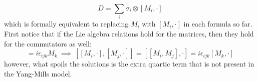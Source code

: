 \begin{equation}
D = \sum_i \sigma_i \otimes [M_i,\cdot ]
\end{equation}
which is formally equivalent to replacing $M_i$ with $[M_i, \cdot ]$ in each formula so far. First notice that if the Lie algebra relations hold for the matrices, then they hold for the commutators as well:
\begin{equation}
[M_i, M_j] = i \epsilon_{ijk} M_k \ \implies \ [[M_i, \cdot ], [M_j, \cdot ]] = [[M_i, M_j], \cdot ] = i \epsilon_{ijk} [M_k, \cdot ]
\end{equation}
however, what spoils the solutions is the extra quartic term that is not present in the Yang-Mills model.



